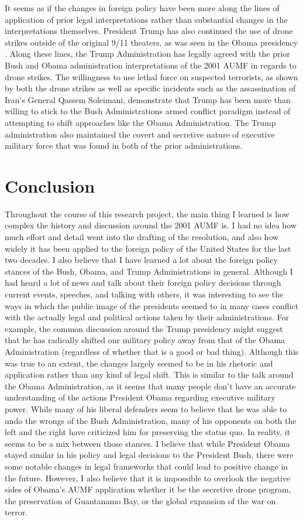 \documentclass[12pt]{article}
\begin{document}
It seems as if the changes in foreign policy have been more along the lines of application of prior legal interpretations rather than substantial changes in the interpretations themselves.
President Trump has also continued the use of drone strikes outside of the original 9/11 theaters, as was seen in the Obama presidency \autocite[35]{sterio2018}.
Along these lines, the Trump Administration has legally agreed with the prior Bush and Obama administration interpretations of the 2001 AUMF in regards to drone strikes.
The willingness to use lethal force on suspected terrorists, as shown by both the drone strikes as well as specific incidents such as the assassination of Iran's General Qassem Soleimani, demonstrate that Trump has been more than willing to stick to the Bush Administrations armed conflict paradigm instead of attempting to shift approaches like the Obama Administration.
The Trump administration also maintained the covert and secretive nature of executive military force that was found in both of the prior administrations.

\section*{Conclusion}
Throughout the course of this research project, the main thing I learned is how complex the history and discussion around the 2001 AUMF is.
I had no idea how much effort and detail went into the drafting of the resolution, and also how widely it has been applied to the foreign policy of the United States for the last two decades.
I also believe that I have learned a lot about the foreign policy stances of the Bush, Obama, and Trump Administrations in general.
Although I had heard a lot of news and talk about their foreign policy decisions through current events, speeches, and talking with others, it was interesting to see the ways in which the public image of the presidents seemed to in many cases conflict with the actually legal and political actions taken by their administrations.
For example, the common discussion around the Trump presidency might suggest that he has radically shifted our military policy away from that of the Obama Administration (regardless of whether that is a good or bad thing).
Although this was true to an extent, the changes largely seemed to be in his rhetoric and application rather than any kind of legal shift.
This is similar to the talk around the Obama Administration, as it seems that many people don't have an accurate understanding of the actions President Obama regarding executive military power.
While many of his liberal defenders seem to believe that he was able to undo the wrongs of the Bush Administration, many of his opponents on both the left and the right have criticized him for preserving the status quo.
In reality, it seems to be a mix between those stances.
I believe that while President Obama stayed similar in his policy and legal decisions to the President Bush, there were some notable changes in legal frameworks that could lead to positive change in the future.
However, I also believe that it is impossible to overlook the negative sides of Obama's AUMF application whether it be the secretive drone program, the preservation of Guantanamo Bay, or the global expansion of the war on terror.
\end{document}
